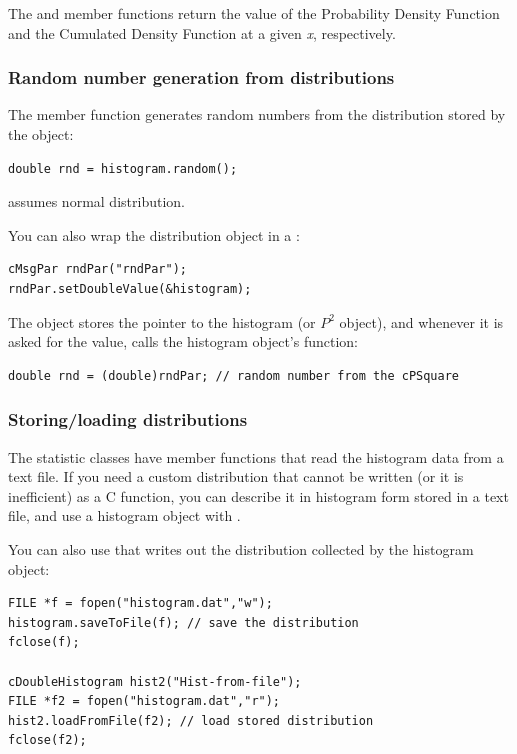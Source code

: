 The  and  member functions
return the value of the Probability Density Function and the Cumulated
Density Function at a given \textit{x}, respectively.


\subsubsection{Random number generation from distributions}


The  member function generates random
numbers from the distribution stored by the
object:

\begin{verbatim}
double rnd = histogram.random();
\end{verbatim}


 assumes normal distribution.

You can also wrap the distribution object in a :

\begin{verbatim}
cMsgPar rndPar("rndPar");
rndPar.setDoubleValue(&histogram);
\end{verbatim}


The  object stores the pointer to the histogram (or $P^{2}$ object),
and whenever it is asked for the value, calls the histogram object's 
function:

\begin{verbatim}
double rnd = (double)rndPar; // random number from the cPSquare
\end{verbatim}

\subsubsection{Storing/loading distributions}


The statistic classes have  member functions
that read the histogram data from a text file. If you need a custom
distribution that cannot be written (or it
is inefficient) as a C function, you can describe it in histogram form
stored in a text file, and use a histogram object with
.

You can also use that writes out the distribution
collected by the histogram object:

\begin{verbatim}
FILE *f = fopen("histogram.dat","w");
histogram.saveToFile(f); // save the distribution
fclose(f);

cDoubleHistogram hist2("Hist-from-file");
FILE *f2 = fopen("histogram.dat","r");
hist2.loadFromFile(f2); // load stored distribution
fclose(f2);
\end{verbatim}


